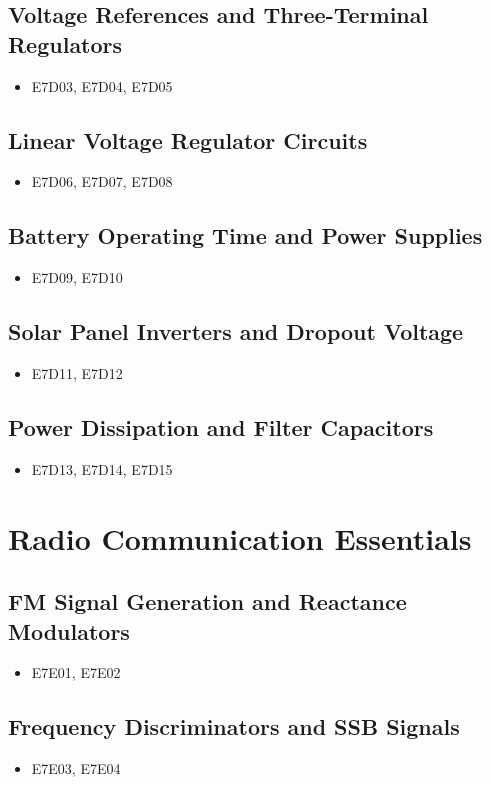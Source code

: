 \documentclass{book}
\begin{document}
\subsection{Voltage References and Three-Terminal Regulators}
\begin{itemize}
    \item E7D03, E7D04, E7D05
\end{itemize}
\subsection{Linear Voltage Regulator Circuits}
\begin{itemize}
    \item E7D06, E7D07, E7D08
\end{itemize}
\subsection{Battery Operating Time and Power Supplies}
\begin{itemize}
    \item E7D09, E7D10
\end{itemize}
\subsection{Solar Panel Inverters and Dropout Voltage}
\begin{itemize}
    \item E7D11, E7D12
\end{itemize}
\subsection{Power Dissipation and Filter Capacitors}
\begin{itemize}
    \item E7D13, E7D14, E7D15
\end{itemize}

\section{Radio Communication Essentials}
\subsection{FM Signal Generation and Reactance Modulators}
\begin{itemize}
    \item E7E01, E7E02
\end{itemize}
\subsection{Frequency Discriminators and SSB Signals}
\begin{itemize}
    \item E7E03, E7E04
\end{itemize}
\end{document}
